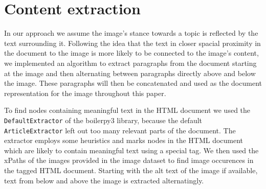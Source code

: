 \documentclass[
]{ceurart}
\begin{document}
\section{Content extraction} \label{content-extraction}

In our approach we assume the image's stance towards a topic is reflected by the text surrounding it. Following the idea that the text in closer spacial proximity in the document to the image is more likely to be connected to the image's content, we implemented an algorithm to extract paragraphs from the document starting at the image and then alternating between paragraphs directly above and below the image. These paragraphs will then be concatenated and used as the document representation for the image throughout this paper.

To find nodes containing meaningful text in the HTML document we used the \texttt{DefaultExtractor} of the boilerpy3 library, because the default \texttt{ArticleExtractor} left out too many relevant parts of the document. The extractor employs some heuristics and marks nodes in the HTML document which are likely to contain meaningful text using a special tag. We then used the xPaths of the images provided in the image dataset to find image occurences in the tagged HTML document. Starting with the alt text of the image if available, text from below and above the image is extracted alternatingly.
\end{document}
